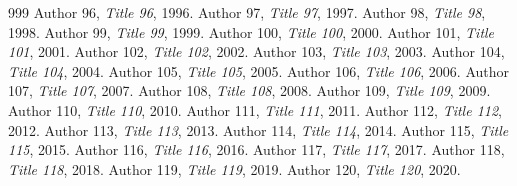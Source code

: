 \documentclass[11pt]{article}
\begin{document}
\begin{thebibliography}{999}
 Author 96, \emph{Title 96}, 1996.
 Author 97, \emph{Title 97}, 1997.
 Author 98, \emph{Title 98}, 1998.
 Author 99, \emph{Title 99}, 1999.
 Author 100, \emph{Title 100}, 2000.
 Author 101, \emph{Title 101}, 2001.
 Author 102, \emph{Title 102}, 2002.
 Author 103, \emph{Title 103}, 2003.
 Author 104, \emph{Title 104}, 2004.
 Author 105, \emph{Title 105}, 2005.
 Author 106, \emph{Title 106}, 2006.
 Author 107, \emph{Title 107}, 2007.
 Author 108, \emph{Title 108}, 2008.
 Author 109, \emph{Title 109}, 2009.
 Author 110, \emph{Title 110}, 2010.
 Author 111, \emph{Title 111}, 2011.
 Author 112, \emph{Title 112}, 2012.
 Author 113, \emph{Title 113}, 2013.
 Author 114, \emph{Title 114}, 2014.
 Author 115, \emph{Title 115}, 2015.
 Author 116, \emph{Title 116}, 2016.
 Author 117, \emph{Title 117}, 2017.
 Author 118, \emph{Title 118}, 2018.
 Author 119, \emph{Title 119}, 2019.
 Author 120, \emph{Title 120}, 2020.
\end{thebibliography}
\end{document}
